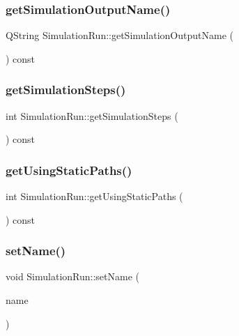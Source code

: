 \subsubsection{\texorpdfstring{getSimulationOutputName()}{getSimulationOutputName()}}
{\footnotesize\ttfamily Q\+String Simulation\+Run\+::get\+Simulation\+Output\+Name (\begin{DoxyParamCaption}{ }\end{DoxyParamCaption}) const\hspace{0.3cm}{\ttfamily [inline]}}

\mbox{\label{class_simulation_run_a5ace491477445d32f2a73092ef5c486f}} 
\subsubsection{\texorpdfstring{getSimulationSteps()}{getSimulationSteps()}}
{\footnotesize\ttfamily int Simulation\+Run\+::get\+Simulation\+Steps (\begin{DoxyParamCaption}{ }\end{DoxyParamCaption}) const\hspace{0.3cm}{\ttfamily [inline]}}

\mbox{\label{class_simulation_run_aff46892b74cc5c707f5ba8d086fd3495}} 
\subsubsection{\texorpdfstring{getUsingStaticPaths()}{getUsingStaticPaths()}}
{\footnotesize\ttfamily int Simulation\+Run\+::get\+Using\+Static\+Paths (\begin{DoxyParamCaption}{ }\end{DoxyParamCaption}) const\hspace{0.3cm}{\ttfamily [inline]}}

\mbox{\label{class_simulation_run_a3aab24d4bc5fdb12752b1acf5b23b52d}} 
\subsubsection{\texorpdfstring{setName()}{setName()}}
{\footnotesize\ttfamily void Simulation\+Run\+::set\+Name (\begin{DoxyParamCaption}\item[{Q\+String}]{name }\end{DoxyParamCaption})}

